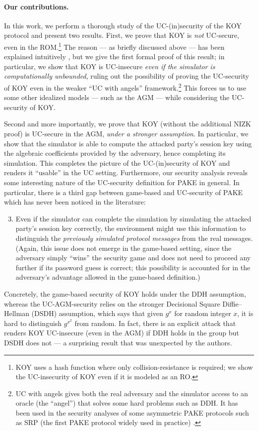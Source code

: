 \paragraph{Our contributions.}
In this work, we perform a thorough study of the UC-(in)security of the KOY protocol and present two results. First, we prove that KOY is \emph{not} UC-secure, even in the ROM.\footnote{KOY uses a hash function where only collision-resistance is required; we show the UC-insecurity of KOY even if it is modeled as an RO.} The reason  --- as briefly discussed above --- has been explained intuitively \cite[Section~3.3]{EC:CHKLM05}, but we give the first formal proof of this result; in particular, we show that KOY is UC-insecure \emph{even if the simulator is computationally unbounded}, ruling out the possibility of proving the UC-security of KOY even in the weaker ``UC with angels'' framework.\footnote{UC with angels \cite{STOC:PraSah04} gives both the real adversary and the simulator access to an oracle (the ``angel'') that solves some hard problems such as DDH. It has been used in the security analyses of some asymmetric PAKE protocols such as SRP (the first PAKE protocol widely used in practice) \cite{CSF:DayLeh24}.} This forces us to use some other idealized models --- such as the AGM --- while considering the UC-security of KOY.

Second and more importantly, we prove that KOY (without the additional NIZK proof) is UC-secure in the AGM, \emph{under a stronger assumption}. In particular, we show that the simulator is able to compute the attacked party's session key using the algebraic coefficients provided by the adversary, hence completing its simulation. This completes the picture of the UC-(in)security of KOY and renders it ``usable'' in the UC setting. Furthermore, our security analysis reveals some interesting nature of the UC-security definition for PAKE in general. In particular, there is a third gap between game-based and UC-security of PAKE which has never been noticed in the literature:
\begin{enumerate}\setcounter{enumi}{2}
  \item Even if the simulator can complete the simulation by simulating the attacked party's session key correctly, the environment might use this information to distinguish the \emph{previously simulated protocol messages} from the real messages. (Again, this issue does not emerge in the game-based setting, since the adversary simply ``wins'' the security game and does not need to proceed any further if its password guess is correct; this possibility is accounted for in the adversary's advantage allowed in the game-based definition.)
\end{enumerate}
Concretely, the game-based security of KOY holds under the DDH assumption, whereas the UC-AGM-security relies on the stronger Decisional Square Diffie--Hellman (DSDH) assumption, which says that given $g^x$ for random integer $x$, it is hard to distinguish $g^{x^2}$ from random. In fact, there is an explicit attack that renders KOY UC-insecure (even in the AGM) if DDH holds in the group but DSDH does not --- a surprising result that was unexpected by the authors.

